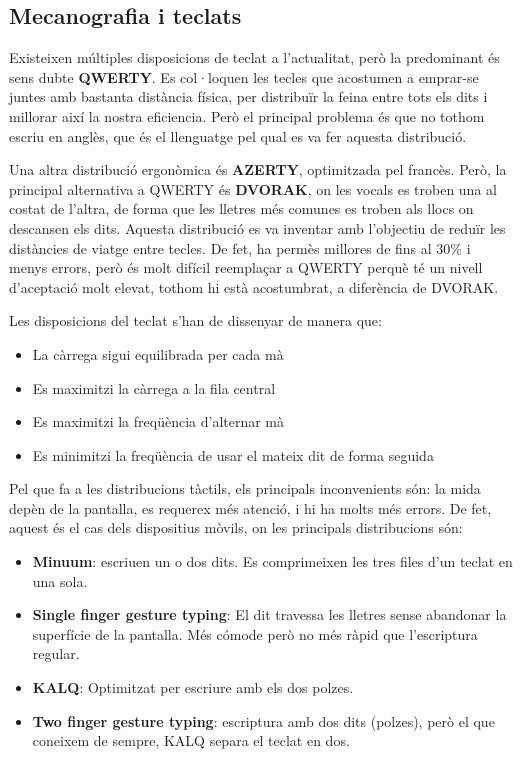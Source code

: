 \documentclass[12pt]{article}
\begin{document}
    \subsection{Mecanografia i teclats}
    Existeixen múltiples disposicions de teclat a l'actualitat, però la predominant és sens dubte \textbf{QWERTY}. Es col·loquen les tecles que acostumen a emprar-se juntes
    amb bastanta distància física, per distribuïr la feina entre tots els dits i millorar així la nostra eficiencia. Però el principal problema és que no tothom escriu en
    anglès, que és el llenguatge pel qual es va fer aquesta distribució.

    \hfill \break
    Una altra distribució ergonòmica és \textbf{AZERTY}, optimitzada pel francès. Però, la principal alternativa a QWERTY és \textbf{DVORAK}, on les vocals es troben una 
    al costat de l'altra, de forma que les lletres més comunes es troben als llocs on descansen els dits. Aquesta distribució es va inventar amb l'objectiu de reduïr les
    distàncies de viatge entre tecles. De fet, ha permès millores de fins al 30\% i menys errors, però és molt difícil reemplaçar a QWERTY perquè té un nivell d'aceptació molt elevat,
    tothom hi està acostumbrat, a diferència de DVORAK.


    \hfill \break
    Les disposicions del teclat s'han de dissenyar de manera que:
    \begin{itemize}
        \item La càrrega sigui equilibrada per cada mà
        \item Es maximitzi la càrrega a la fila central
        \item Es maximitzi la freqüència d'alternar mà
        \item Es minimitzi la freqüència de usar el mateix dit de forma seguida
    \end{itemize}

    Pel que fa a les distribucions tàctils, els principals inconvenients són: la mida depèn de la pantalla, es requerex més atenció, i hi ha molts més errors. De fet, 
    aquest és el cas dels dispositius mòvils, on les principals distribucions són:
    \begin{itemize}
        \item \textbf{Minuum}: escriuen un o dos dits. Es comprimeixen les tres files d'un teclat en una sola.
        \item \textbf{Single finger gesture typing}: El dit travessa les lletres sense abandonar la superfície de la pantalla. Més cómode però no més ràpid que l'escriptura regular.
        \item \textbf{KALQ}: Optimitzat per escriure amb els dos polzes.
        \item \textbf{Two finger gesture typing}: escriptura amb dos dits (polzes), però el que coneixem de sempre, KALQ separa el teclat en dos.
    \end{itemize}
\end{document}

